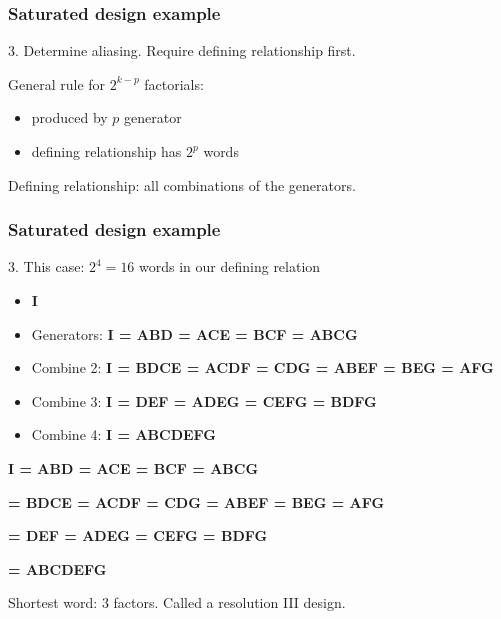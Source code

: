 \begin{frame}\frametitle{Saturated design example}

	3. Determine aliasing. Require defining relationship first.

	General rule for $2^{k-p}$ factorials:
	\begin{itemize}
		\item	produced by $p$ generator
		\item	defining relationship has $2^p$ words
	\end{itemize}

	Defining relationship: all combinations of the generators.
\end{frame}

\begin{frame}\frametitle{Saturated design example}

	3. This case: $2^4 = 16$ words in our defining relation
	\begin{itemize}
		\item	\textbf{I}
		\item	Generators: \textbf{I = ABD = ACE = BCF = ABCG}
		\item	Combine 2: \textbf{I = BDCE = ACDF = CDG = ABEF = BEG = AFG}
		\item	Combine 3: \textbf{I = DEF = ADEG = CEFG = BDFG}
		\item	Combine 4: \textbf{I = ABCDEFG}
	\end{itemize}

	\textbf{I = ABD = ACE = BCF = ABCG}

	\textbf{ = BDCE = ACDF = CDG = ABEF = BEG = AFG}

	\textbf{ = DEF = ADEG = CEFG = BDFG }

	\textbf{ = ABCDEFG}

	Shortest word: 3 factors. Called a resolution III design.
\end{frame}

